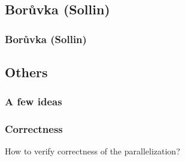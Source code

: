 \documentclass{beamer}
\begin{document}
\subsection{Borůvka (Sollin)}
\begin{frame}
\frametitle{Borůvka (Sollin)}
\end{frame}
\subsection{Others}
\begin{frame}
\frametitle{A few ideas}
\end{frame}
\begin{frame}
\frametitle{Correctness}
How to verify correctness of the parallelization?
\end{frame}

\end{document}
